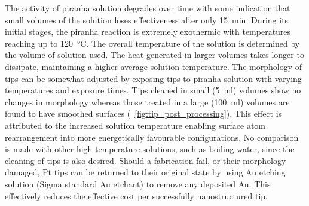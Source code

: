 \documentclass{article}
\begin{document}
The activity of piranha solution degrades over time with some indication that small volumes of the solution loses effectiveness after only \SI{15}{\minute}. During its initial stages, the piranha reaction is extremely exothermic with temperatures reaching up to \SI{120}{\celsius}. The overall temperature of the solution is determined by the volume of solution used. The heat generated in larger volumes takes longer to dissipate, maintaining a higher average solution temperature. The morphology of tips can be somewhat adjusted by exposing tips to piranha solution with varying temperatures and exposure times. Tips cleaned in small (\SI{5}{ml}) volumes show no changes in morphology whereas those treated in a large (\SI{100}{ml}) volumes are found to have smoothed surfaces (\figurename~\ref{fig:tip_post_processing}). This effect is attributed to the increased solution temperature enabling surface atom rearrangement into more energetically favourable configurations. No comparison is made with other high-temperature solutions, such as boiling water, since the cleaning of tips is also desired.
Should a fabrication fail, or their morphology damaged, Pt tips can be returned to their original state by using Au etching solution (Sigma standard Au etchant) to remove any deposited Au. This effectively reduces the effective cost per successfully nanostructured tip.
\end{document}
